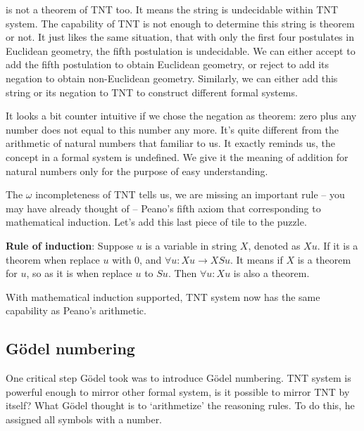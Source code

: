 \documentclass{article}
\begin{document}
is not a theorem of TNT too. It means the string is undecidable within TNT system. The capability of TNT is not enough to determine this string is theorem or not. It just likes the same situation, that with only the first four postulates in Euclidean geometry, the fifth postulation is undecidable. We can either accept to add the fifth postulation to obtain Euclidean geometry, or reject to add its negation to obtain non-Euclidean geometry. Similarly, we can either add this string or its negation to TNT to construct different formal systems.

It looks a bit counter intuitive if we chose the negation as theorem: zero plus any number does not equal to this number any more. It's quite different from the arithmetic of natural numbers that familiar to us. It exactly reminds us, the concept in a formal system is undefined. We give it the meaning of addition for natural numbers only for the purpose of easy understanding.

The $\omega$ incompleteness of TNT tells us, we are missing an important rule -- you may have already thought of -- Peano's fifth axiom that corresponding to mathematical induction. Let's add this last piece of tile to the puzzle.

\textbf{Rule of induction}: Suppose $u$ is a variable in string $X$, denoted as $X{u}$. If it is a theorem when replace $u$ with 0, and $\forall u: X{u} \to X{Su}$. It means if $X$ is a theorem for $u$, so as it is when replace $u$ to $Su$. Then $\forall u: X{u}$ is also a theorem.

With mathematical induction supported, TNT system now has the same capability as Peano's arithmetic.

\begin{Exercise}
\end{Exercise}

\subsection{Gödel numbering}
One critical step Gödel took was to introduce Gödel numbering. TNT system is powerful enough to mirror other formal system, is it possible to mirror TNT by itself? What Gödel thought is to `arithmetize' the reasoning rules. To do this, he assigned all symbols with a number.
\end{document}

